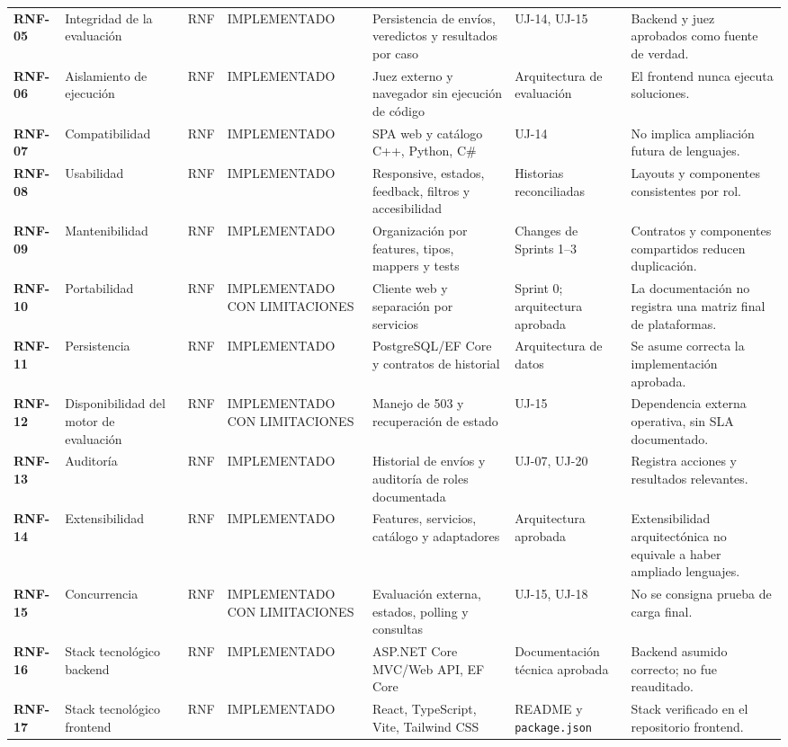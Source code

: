 \documentclass[11pt,a4paper]{article}
\begin{document}
\begin{landscape}
\begin{longtable}{>{\bfseries}p{1.25cm}p{4.0cm}p{1.15cm}p{3.35cm}p{4.5cm}p{4.0cm}p{5.1cm}}
RNF-05 & Integridad de la evaluación & RNF & IMPLEMENTADO & Persistencia de envíos, veredictos y resultados por caso & UJ-14, UJ-15 & Backend y juez aprobados como fuente de verdad. \\
RNF-06 & Aislamiento de ejecución & RNF & IMPLEMENTADO & Juez externo y navegador sin ejecución de código & Arquitectura de evaluación & El frontend nunca ejecuta soluciones. \\
RNF-07 & Compatibilidad & RNF & IMPLEMENTADO & SPA web y catálogo C++, Python, C\# & UJ-14 & No implica ampliación futura de lenguajes. \\
RNF-08 & Usabilidad & RNF & IMPLEMENTADO & Responsive, estados, feedback, filtros y accesibilidad & Historias reconciliadas & Layouts y componentes consistentes por rol. \\
RNF-09 & Mantenibilidad & RNF & IMPLEMENTADO & Organización por features, tipos, mappers y tests & Changes de Sprints 1--3 & Contratos y componentes compartidos reducen duplicación. \\
RNF-10 & Portabilidad & RNF & IMPLEMENTADO CON LIMITACIONES & Cliente web y separación por servicios & Sprint 0; arquitectura aprobada & La documentación no registra una matriz final de plataformas. \\
RNF-11 & Persistencia & RNF & IMPLEMENTADO & PostgreSQL/EF Core y contratos de historial & Arquitectura de datos & Se asume correcta la implementación aprobada. \\
RNF-12 & Disponibilidad del motor de evaluación & RNF & IMPLEMENTADO CON LIMITACIONES & Manejo de 503 y recuperación de estado & UJ-15 & Dependencia externa operativa, sin SLA documentado. \\
RNF-13 & Auditoría & RNF & IMPLEMENTADO & Historial de envíos y auditoría de roles documentada & UJ-07, UJ-20 & Registra acciones y resultados relevantes. \\
RNF-14 & Extensibilidad & RNF & IMPLEMENTADO & Features, servicios, catálogo y adaptadores & Arquitectura aprobada & Extensibilidad arquitectónica no equivale a haber ampliado lenguajes. \\
RNF-15 & Concurrencia & RNF & IMPLEMENTADO CON LIMITACIONES & Evaluación externa, estados, polling y consultas & UJ-15, UJ-18 & No se consigna prueba de carga final. \\
RNF-16 & Stack tecnológico backend & RNF & IMPLEMENTADO & ASP.NET Core MVC/Web API, EF Core & Documentación técnica aprobada & Backend asumido correcto; no fue reauditado. \\
RNF-17 & Stack tecnológico frontend & RNF & IMPLEMENTADO & React, TypeScript, Vite, Tailwind CSS & README y \texttt{package.json} & Stack verificado en el repositorio frontend. \\

\end{longtable}
\end{landscape}
\end{document}
